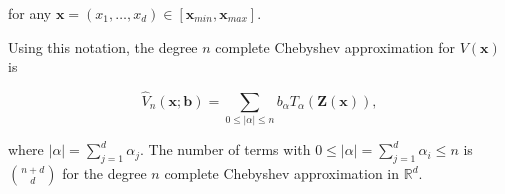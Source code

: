 \documentclass[12pt]{article}
\begin{document}
for any $\boldsymbol{x}=(x_1,\dots,x_d) \in [\boldsymbol{x}_{min},\boldsymbol{x}_{max}]$.

  Using this notation, the degree $n$ complete Chebyshev approximation for $V(\boldsymbol{x})$ is

\begin{equation*}
  \hat{V}_n(\boldsymbol{x};\boldsymbol{b})=\sum_{0 \leq |\alpha| \leq n} b_{\alpha} T_{\alpha} (\boldsymbol{Z}(\boldsymbol{x})),
\end{equation*}

where $|\alpha|=\sum_{j=1}^d \alpha_j$. The number of terms with $0\leq|\alpha|=\sum_{j=1}^d\alpha_i\leq n$ is $\binom{n+d}{d}$ for the degree $n$ complete Chebyshev approximation in $\mathbb{R}^d$.
\end{document}
